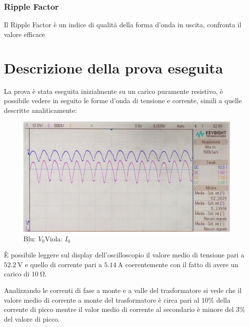 \documentclass[a4paper,10pt]{article}
\begin{document}
\subsubsection{Ripple Factor}
Il Ripple Factor è un indice di qualità della forma d'onda in uscita, confronta
il valore efficace 

\section{Descrizione della prova eseguita}
La prova è stata eseguita inizialmente su un carico puramente resistivo, 
è possibile vedere in seguito le forme d'onda di tensione e corrente, simili a quelle 
descritte analiticamente:
\begin{figure}[H]
\centering
 \includegraphics[keepaspectratio=true,width=0.9\linewidth]
 {tensione_e_corrente_2_neg.jpg}
 \caption{Blu: \(V_0\)\quad Viola: \(I_0\)}
 \label{fig:tensioni_carico_R}
\end{figure}
È possibile leggere sul display dell'oscilloscopio il valore medio di tensione pari
a $\SI{52.2}{\volt}$ e quello di corrente pari a $\SI{5.14}{\ampere}$ coerentemente
con il fatto di avere un carico di $\SI{10}{\ohm}$.

Analizzando le correnti di fase a monte e a valle del trasformatore si vede che il
valore medio di corrente a monte del trasformatore è circa pari al 10\% della 
corrente di picco mentre il valor medio di corrente al secondario è minore del 3\%
del valore di picco.
\end{document}
